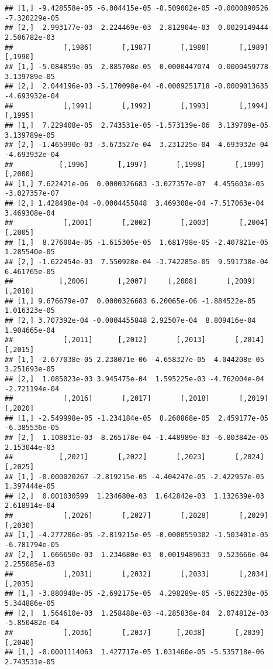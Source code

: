 \documentclass[
]{article}
\begin{document}
\begin{verbatim}
## [1,] -9.428558e-05 -6.004415e-05 -8.509002e-05 -0.0000890526 -7.320229e-05
## [2,]  2.993177e-03  2.224469e-03  2.812904e-03  0.0029149444  2.506782e-03
##            [,1986]       [,1987]       [,1988]       [,1989]       [,1990]
## [1,] -5.084859e-05  2.885708e-05  0.0000447074  0.0000459778  3.139789e-05
## [2,]  2.044196e-03 -5.170098e-04 -0.0009251718 -0.0009013635 -4.693932e-04
##            [,1991]       [,1992]       [,1993]       [,1994]       [,1995]
## [1,]  7.229408e-05  2.743531e-05 -1.573139e-06  3.139789e-05  3.139789e-05
## [2,] -1.465990e-03 -3.673527e-04  3.231225e-04 -4.693932e-04 -4.693932e-04
##           [,1996]       [,1997]       [,1998]       [,1999]       [,2000]
## [1,] 7.622421e-06  0.0000326683 -3.027357e-07  4.455603e-05 -3.027357e-07
## [2,] 1.428498e-04 -0.0004455848  3.469308e-04 -7.517063e-04  3.469308e-04
##            [,2001]       [,2002]       [,2003]       [,2004]      [,2005]
## [1,]  8.276004e-05 -1.615305e-05  1.681798e-05 -2.407821e-05 1.285540e-05
## [2,] -1.622454e-03  7.550928e-04 -3.742285e-05  9.591738e-04 6.461765e-05
##           [,2006]       [,2007]     [,2008]       [,2009]      [,2010]
## [1,] 9.676679e-07  0.0000326683 6.20065e-06 -1.884522e-05 1.016323e-05
## [2,] 3.707392e-04 -0.0004455848 2.92507e-04  8.809416e-04 1.904665e-04
##            [,2011]      [,2012]       [,2013]       [,2014]       [,2015]
## [1,] -2.677038e-05 2.238071e-06 -4.658327e-05  4.044208e-05  3.251693e-05
## [2,]  1.085023e-03 3.945475e-04  1.595225e-03 -4.762004e-04 -2.721194e-04
##            [,2016]       [,2017]       [,2018]       [,2019]       [,2020]
## [1,] -2.549998e-05 -1.234184e-05  8.260868e-05  2.459177e-05 -6.385536e-05
## [2,]  1.108831e-03  8.265178e-04 -1.448989e-03 -6.803842e-05  2.153044e-03
##           [,2021]       [,2022]       [,2023]       [,2024]      [,2025]
## [1,] -0.000020267 -2.819215e-05 -4.404247e-05 -2.422957e-05 1.397444e-05
## [2,]  0.001030599  1.234680e-03  1.642842e-03  1.132639e-03 2.618914e-04
##            [,2026]       [,2027]       [,2028]       [,2029]       [,2030]
## [1,] -4.277206e-05 -2.819215e-05 -0.0000559302 -1.503401e-05 -6.781794e-05
## [2,]  1.666650e-03  1.234680e-03  0.0019489633  9.523666e-04  2.255085e-03
##            [,2031]       [,2032]       [,2033]       [,2034]       [,2035]
## [1,] -3.880948e-05 -2.692175e-05  4.298289e-05 -5.862238e-05  5.344886e-05
## [2,]  1.564610e-03  1.258488e-03 -4.285838e-04  2.074812e-03 -5.850482e-04
##            [,2036]       [,2037]      [,2038]       [,2039]       [,2040]
## [1,] -0.0001114063  1.427717e-05 1.031460e-05 -5.535718e-06  2.743531e-05

\end{verbatim}
\end{document}
